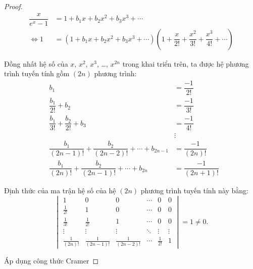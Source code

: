 \documentclass[class=nhvh-linear-algebra,crop=false]{standalone}
\begin{document}
\begin{proof}
	\begingroup{}
	\allowdisplaybreaks{}
	\begin{align*}
		\dfrac{x}{e^{x}-1} & = 1 + b_{1}x + b_{2}x^{2} + b_{3}x^{3} + \cdots                                                                                  \\
		\Leftrightarrow 1  & = (1 + b_{1}x + b_{2}x^{2} + b_{3}x^{3} + \cdots)\left(1 + \dfrac{x}{2!} + \dfrac{x^{2}}{3!} + \dfrac{x^{3}}{4!} + \cdots\right)
	\end{align*}
	\endgroup{}
	\par Đồng nhất hệ số của $x$, $x^{2}$, $x^{3}$, \ldots, $x^{2n}$ trong khai triển trên, ta được hệ phương trình tuyến tính gồm $(2n)$ phương trình:
	\begin{align*}
		 & b_{1}                                                               & = \dfrac{-1}{2!}      \\
		 & \dfrac{b_{1}}{2!} + b_{2}                                           & = \dfrac{-1}{3!}      \\
		 & \dfrac{b_{1}}{3!} + \dfrac{b_{2}}{2!} + b_{3}                       & = \dfrac{-1}{4!}      \\
		 &                                                                     & \vdots                \\
		 & \dfrac{b_{1}}{(2n-1)!} + \dfrac{b_{2}}{(2n-2)!} + \cdots + b_{2n-1} & = \dfrac{-1}{(2n)!}   \\
		 & \dfrac{b_{1}}{(2n)!} + \dfrac{b_{2}}{(2n-1)!} + \cdots + b_{2n}     & = \dfrac{-1}{(2n+1)!}
	\end{align*}
	\par Định thức của ma trận hệ số của hệ $(2n)$ phương trình tuyến tính này bằng:
	\[
		\begin{vmatrix}
			1               & 0                 & 0                 & \cdots & 0            & 0      \\
			\frac{1}{2!}    & 1                 & 0                 & \cdots & 0            & 0      \\
			\frac{1}{3!}    & \frac{1}{2!}      & 1                 & \cdots & 0            & 0      \\
			\vdots          & \vdots            & \vdots            & \ddots & \vdots       & \vdots \\
			\frac{1}{(2n)!} & \frac{1}{(2n-1)!} & \frac{1}{(2n-2)!} & \cdots & \frac{1}{2!} & 1
		\end{vmatrix} = 1 \ne 0.
	\]
	\par Áp dụng công thức Cramer

\end{proof}
\end{document}
